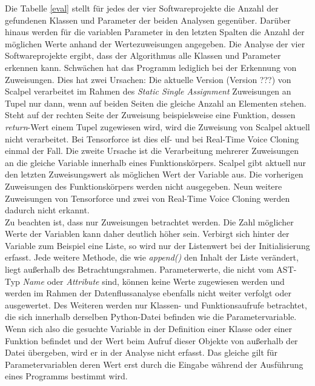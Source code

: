 \documentclass[german,bachelor]{swsLeipzig}
\begin{document}
Die Tabelle \ref{eval} stellt für jedes der vier Softwareprojekte die Anzahl der gefundenen Klassen und Parameter der beiden Analysen gegenüber.
Darüber hinaus werden für die variablen Parameter in den letzten Spalten die Anzahl der möglichen Werte anhand
der Wertezuweisungen angegeben.
Die Analyse der vier Softwareprojekte ergibt, dass der Algorithmus alle Klassen und Parameter erkennen kann.
Schwächen hat das Programm lediglich bei der Erkennung von Zuweisungen.
Dies hat zwei Ursachen:
Die aktuelle Version (Version ???) von Scalpel verarbeitet im Rahmen des \textit{Static Single Assignment} Zuweisungen an Tupel nur dann,
wenn auf beiden Seiten die gleiche Anzahl an Elementen stehen.
Steht auf der rechten Seite der Zuweisung beispielsweise eine Funktion, dessen \textit{return}-Wert einem Tupel zugewiesen wird,
wird die Zuweisung von Scalpel aktuell nicht verarbeitet.
Bei Tensorforce ist dies elf- und bei Real-Time Voice Cloning einmal der Fall.
Die zweite Ursache ist die Verarbeitung mehrerer Zuweisungen an die gleiche Variable innerhalb eines Funktionskörpers.
Scalpel gibt aktuell nur den letzten Zuweisungswert als möglichen Wert der Variable aus.
Die vorherigen Zuweisungen des Funktionskörpers werden nicht ausgegeben.
Neun weitere Zuweisungen von Tensorforce und zwei von Real-Time Voice Cloning werden dadurch nicht erkannt.\\

Zu beachten ist, dass nur Zuweisungen betrachtet werden.
Die Zahl möglicher Werte der Variablen kann daher deutlich höher sein.
Verbirgt sich hinter der Variable zum Beispiel eine Liste, so wird nur der Listenwert bei der Initialisierung erfasst.
Jede weitere Methode, die wie \textit{append()} den Inhalt der Liste verändert, liegt außerhalb des Betrachtungsrahmen.
Parameterwerte, die nicht vom AST-Typ \textit{Name} oder \textit{Attribute} sind, können keine Werte zugewiesen werden
und werden im Rahmen der Datenflussanalyse ebenfalls nicht weiter verfolgt oder ausgewertet.
Des Weiteren werden nur Klassen- und Funktionsaufrufe betrachtet, die sich innerhalb derselben Python-Datei befinden wie die Parametervariable.
Wenn sich also die gesuchte Variable in der Definition einer Klasse oder einer Funktion befindet und der Wert beim Aufruf
dieser Objekte von außerhalb der Datei übergeben, wird er in der Analyse nicht erfasst.
Das gleiche gilt für Parametervariablen deren Wert erst durch die Eingabe während der Ausführung eines Programms bestimmt wird.\\
\end{document}
